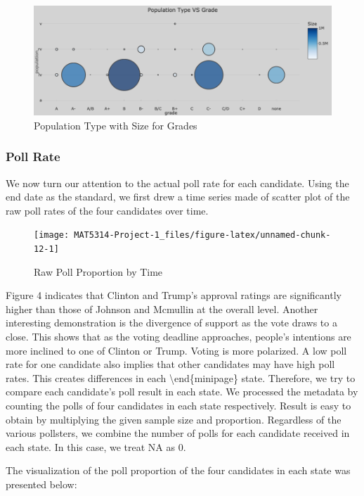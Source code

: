 \documentclass[
  12pt,
]{article}
\begin{document}
\begin{figure}
\centering
\includegraphics{./Figures/popChart.png}
\caption{Population Type with Size for Grades}
\end{figure}

\hypertarget{poll-rate}{%
\subsubsection{Poll Rate}\label{poll-rate}}

We now turn our attention to the actual poll rate for each candidate.
Using the end date as the standard, we first drew a time series made of
scatter plot of the raw poll rates of the four candidates over time.

\begin{figure}
\texttt{[image: MAT5314-Project-1\_files/figure-latex/unnamed-chunk-12-1]} \caption{Raw Poll Proportion by Time}\label{fig:unnamed-chunk-12}
\end{figure}

Figure 4 indicates that Clinton and Trump's approval ratings are
significantly higher than those of Johnson and Mcmullin at the overall
level. Another interesting demonstration is the divergence of support as
the vote draws to a close. This shows that as the voting deadline
approaches, people's intentions are more inclined to one of Clinton or
Trump. Voting is more polarized. A low poll rate for one candidate also
implies that other candidates may have high poll rates. This creates
differences in each \textbackslash end\{minipage\} state. Therefore, we
try to compare each candidate's poll result in each state. We processed
the metadata by counting the polls of four candidates in each state
respectively. Result is easy to obtain by multiplying the given sample
size and proportion. Regardless of the various pollsters, we combine the
number of polls for each candidate received in each state. In this case,
we treat NA as 0.

The visualization of the poll proportion of the four candidates in each
state was presented below:
\end{document}
